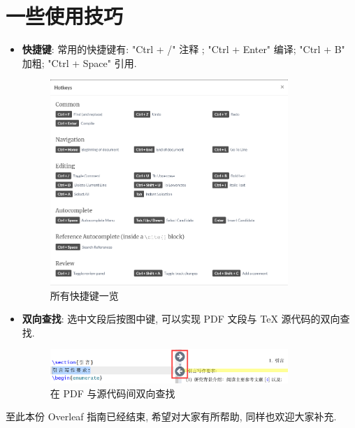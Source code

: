 \documentclass{booki}
\begin{document}
\section{一些使用技巧}\label{header-n57}

\begin{itemize}
    \item \textbf{快捷键}: 常用的快捷键有: "Ctrl + /" 注释 ; "Ctrl + Enter" 编译; "Ctrl + B" 加粗; "Ctrl + Space" 引用.
          \begin{figure}[H]
              \centering
              \includegraphics[width=0.85\textwidth]{Guidepics/20210415185428.png}
              \caption{所有快捷键一览}
          \end{figure}
    \item \textbf{双向查找}: 选中文段后按图中键, 可以实现 PDF 文段与 TeX 源代码的双向查找.
          \begin{figure}[H]
              \centering
              \includegraphics[width=0.85\textwidth]{Guidepics/20210415184949.png}
              \caption{在 PDF 与源代码间双向查找}
          \end{figure}
\end{itemize}

至此本份 Overleaf 指南已经结束, 希望对大家有所帮助, 同样也欢迎大家补充.
% 
\end{document}
